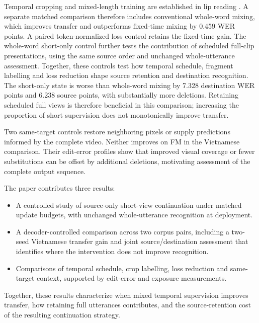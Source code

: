 Temporal cropping and mixed-length training are established in lip reading
\cite{martinez2020lipreading,prajwal2022subword}. A separate matched comparison
therefore includes conventional whole-word mixing, which improves transfer and
outperforms fixed-time mixing by 0.459 WER points. A paired token-normalized loss
control retains the fixed-time gain. The whole-word short-only control further
tests the contribution of scheduled full-clip presentations, using the same
source order and unchanged whole-utterance assessment. Together, these controls
test how temporal schedule, fragment labelling and loss reduction shape source
retention and destination recognition.
The short-only state is worse than whole-word mixing by 7.328 destination WER
points and 6.238 source points, with substantially more deletions. Retaining
scheduled full views is therefore beneficial in this comparison; increasing
the proportion of short supervision does not monotonically improve transfer.

Two same-target controls restore neighboring pixels or supply predictions
informed by the complete video. Neither improves on FM in the Vietnamese
comparison. Their edit-error profiles show that improved visual coverage or
fewer substitutions can be offset by additional deletions, motivating assessment
of the complete output sequence.

The paper contributes three results:
\begin{itemize}
 \item A controlled study of source-only short-view continuation under matched
 update budgets, with unchanged whole-utterance recognition at deployment.
 \item A decoder-controlled comparison across two corpus pairs, including a
 two-seed Vietnamese transfer gain and joint source/destination assessment
 that identifies where the intervention does not improve recognition.
 \item Comparisons of temporal schedule, crop labelling, loss reduction and
 same-target context, supported by edit-error and exposure measurements.
\end{itemize}
Together, these results characterize when mixed temporal supervision improves
transfer, how retaining full utterances contributes, and the source-retention
cost of the resulting continuation strategy.
